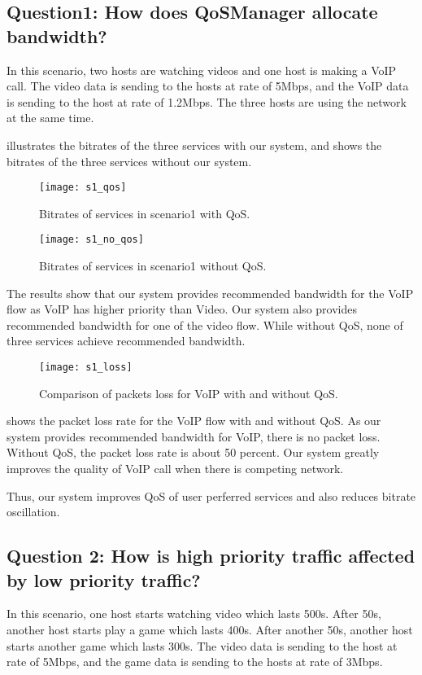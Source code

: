 \subsection{Question1: How does QoSManager allocate bandwidth?}
In this scenario, two hosts are watching videos and one host is making a VoIP call.
The video data is sending to the hosts at rate of 5Mbps, and the VoIP data is sending to the host at rate of 1.2Mbps.
The three hosts are using the network at the same time.  

 illustrates the bitrates of the three services with our system, and  shows the bitrates of the three services without our system. 

\begin{figure}[htb]
\centering
\texttt{[image: s1\_qos]}
\caption{Bitrates of services in scenario1 with QoS.}
\label{fig:s1_qos}
\end{figure}


\begin{figure}[htb]
\centering
\texttt{[image: s1\_no\_qos]}
\caption{Bitrates of services in scenario1 without QoS.}
\label{fig:s1_no_qos}
\end{figure}

The results show that our system provides recommended bandwidth for the VoIP flow as VoIP has higher priority than Video. 
Our system also provides recommended bandwidth for one of the video flow. While without QoS, none of three services achieve recommended bandwidth.

\begin{figure}[htb]
\centering
\texttt{[image: s1\_loss]}
\caption{Comparison of packets loss for VoIP with and without QoS.}
\label{fig:s1_loss}
\end{figure}

 shows the packet loss rate for the VoIP flow with and without QoS. As our system provides recommended bandwidth for VoIP, there is no packet loss. Without QoS, the packet loss rate is about 50 percent. Our system greatly improves the quality of VoIP call when there is competing network.

Thus, our system improves QoS of user perferred services and also reduces bitrate oscillation. 

\subsection{Question 2: How is high priority traffic affected by low priority traffic?}
In this scenario, one host starts watching video which lasts 500s. After 50s, another host starts play a game which lasts 400s. After another 50s, another host starts another game which lasts 300s.
The video data is sending to the host at rate of 5Mbps, and the game data is sending to the hosts at rate of 3Mbps.


